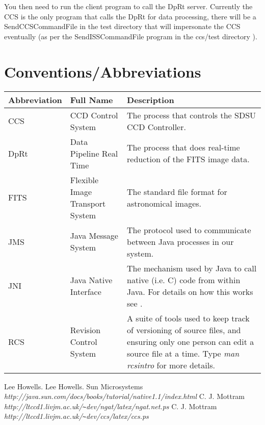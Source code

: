 \documentclass[10pt,a4paper]{article}
\begin{document}
You then need to run the client program to call the DpRt server. Currently the CCS is the only program that
calls the DpRt for data processing, there will be a SendCCSCommandFile in the test directory that will
impersonate the CCS eventually (as per the SendISSCommandFile program in the ccs/test directory \cite{bib:ccs}).

\section{Conventions/Abbreviations}
\begin{center}
\begin{tabular}{|l|l|p{25em}|}
\hline
{\bf Abbreviation} & {\bf Full Name} & {\bf Description} \\
\hline
CCS  & CCD Control System      		& The process that controls the SDSU CCD Controller. \\
DpRt & Data Pipeline Real Time 		& The process that does real-time reduction of the FITS image data. \\
FITS & Flexible Image Transport System 	& The standard file format for astronomical images. \\
JMS  & Java Message System     		& The protocol used to communicate between Java processes in our system. \\
JNI  & Java Native Interface   		& The mechanism used by Java to call native (i.e. C) code from within Java. For
details on how this works see \cite{bib:jnitut}. \\
RCS  & Revision Control System		& A suite of tools used to keep track of versioning of source files, and
ensuring only one person can edit a source file at a time. Type {\em man rcsintro} for more details. \\
\hline
\end{tabular}
\end{center}

\begin{thebibliography}{99}
Lee Howells.
Lee Howells.
Sun Microsystems 
{\em http://java.sun.com/docs/books/tutorial/native1.1/index.html}
C. J. Mottram {\em http://ltccd1.livjm.ac.uk/\verb'~'dev/ngat/latex/ngat.net.ps}
C. J. Mottram {\em http://ltccd1.livjm.ac.uk/\verb'~'dev/ccs/latex/ccs.ps}
\end{thebibliography}
\end{document}

